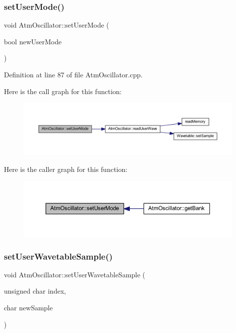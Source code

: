 \subsubsection{\texorpdfstring{set\+User\+Mode()}{setUserMode()}}
{\footnotesize\ttfamily void Atm\+Oscillator\+::set\+User\+Mode (\begin{DoxyParamCaption}\item[{bool}]{new\+User\+Mode }\end{DoxyParamCaption})}



Definition at line 87 of file Atm\+Oscillator.\+cpp.

Here is the call graph for this function\+:
\nopagebreak
\begin{figure}[H]
\begin{center}
\leavevmode
\includegraphics[width=350pt]{class_atm_oscillator_aafaccbb54d52f2c0eb07eb968498eef4_cgraph}
\end{center}
\end{figure}
Here is the caller graph for this function\+:
\nopagebreak
\begin{figure}[H]
\begin{center}
\leavevmode
\includegraphics[width=350pt]{class_atm_oscillator_aafaccbb54d52f2c0eb07eb968498eef4_icgraph}
\end{center}
\end{figure}
\mbox{\label{class_atm_oscillator_aa62dba14693f65adcb3daa7aa4757ba1}} 
\subsubsection{\texorpdfstring{set\+User\+Wavetable\+Sample()}{setUserWavetableSample()}}
{\footnotesize\ttfamily void Atm\+Oscillator\+::set\+User\+Wavetable\+Sample (\begin{DoxyParamCaption}\item[{unsigned char}]{index,  }\item[{char}]{new\+Sample }\end{DoxyParamCaption})}



